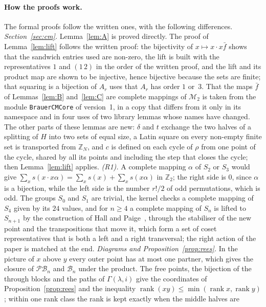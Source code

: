 \documentclass[11pt]{article}
\theoremstyle{remark}
\newcommand{\B}{\mathcal B}
\newcommand{\PB}{\mathcal{PB}}
\newcommand{\M}{\mathcal M}
\newcommand{\Z}{\mathbb Z}
\newcommand{\rk}{\operatorname{rank}}
\newcommand{\Mt}{\M_2}
\begin{document}
\paragraph{How the proofs work.}
The formal proofs follow the written ones, with the following differences.
\emph{Section~\ref{sec:cm}.} Lemma~\ref{lem:A} is proved directly. The proof of
Lemma~\ref{lem:lift} follows the written proof: the bijectivity of $x\mapsto
x\cdot x\bar f$ shows that the sandwich entries used are non-zero, the lift is
built with the representatives $1$ and $(1\,2)$ in the order of the written
proof, and the lift and its product map are shown to be injective, hence
bijective because the sets are finite; that squaring is a bijection of $A_r$
uses that $A_r$ has order $1$ or~$3$. That the maps $\bar f$ of
Lemmas~\ref{lem:B} and~\ref{lem:C} are complete mappings of $\Mt$ is taken from
the module \texttt{BrauerCMCore} of version~1, in a copy that differs from it
only in its namespace and in four uses of two library lemmas whose names have
changed. The other parts of these lemmas are new: $\delta$ and $t$ exchange
the two halves of a splitting of $H$ into two sets of equal size, a Latin
square on every non-empty finite set is transported from $\Z_N$, and $c$ is
defined on each cycle of $\rho$ from one point of the cycle, shared by all its
points and including the step that closes the cycle; then Lemma~\ref{lem:lift}
applies.
\emph{(R1).} A complete mapping $\alpha$ of $S_2$ or $S_3$ would give
$\sum_x s(x\cdot x\alpha)=\sum_x s(x)+\sum_x s(x\alpha)$ in $\Z_2$; the right
side is $0$, since $\alpha$ is a bijection, while the left side is the number
$r!/2$ of odd permutations, which is odd. The groups $S_0$ and $S_1$ are
trivial, the kernel checks a complete mapping of $S_4$ given by its $24$
values, and for $n\ge4$ a complete mapping of $S_n$ is lifted to $S_{n+1}$ by
the construction of Hall and Paige~\cite[Theorem~1 and the proof of
Theorem~2]{hp55}, through the stabiliser of the new point and the
transpositions that move it, which form a set of coset representatives that
is both a left and a right transversal; the right action of the paper is
matched at the end.
\emph{Diagrams and Proposition~\ref{prop:rees}.} In the picture of $x$ above
$y$ every outer point has at most one partner, which gives the closure of
$\PB_n$ and $\B_n$ under the product. The free points, the bijection of the
through blocks and the paths of $\Gamma(\lambda,i)$ give the coordinates of
Proposition~\ref{prop:rees} and the inequality $\rk(xy)\le\min(\rk x,\rk y)$;
within one rank class the rank is kept exactly when the middle halves are
\end{document}
